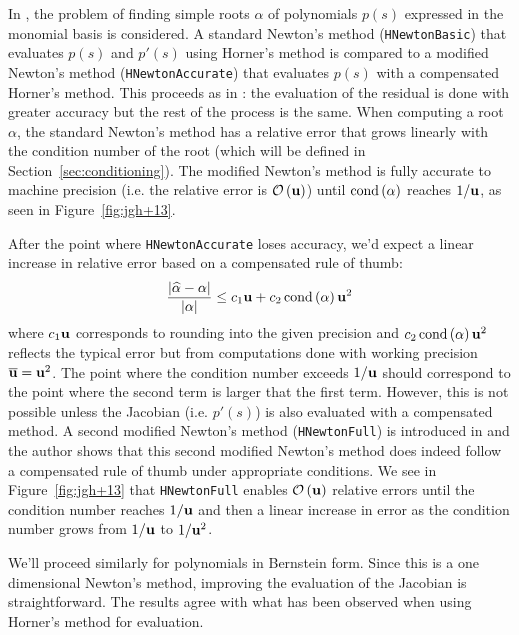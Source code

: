 In \cite{Graillat2008}, the problem of finding simple roots \(\alpha\) of
polynomials \(p(s)\) expressed in the monomial basis is considered.
A standard Newton's method (\texttt{HNewtonBasic}) that evaluates \(p(s)\)
and \(p'(s)\) using Horner's method is compared to a modified Newton's method
(\texttt{HNewtonAccurate}) that evaluates \(p(s)\) with a compensated
Horner's method. This proceeds as in \cite{Tisseur2001}: the evaluation of
the residual is done with greater accuracy but the rest of the process
is the same. When computing a root \(\alpha\), the standard Newton's method
has a relative error that grows linearly with the condition number of the
root (which will be defined in Section~\ref{sec:conditioning}). The
modified Newton's method is fully accurate to machine precision (i.e.
the relative error is \(\mathcal{O}\left(\mathbf{u}\right)\)) until \(\operatorname{cond}\left(\alpha\right)\) reaches
\(1/\mathbf{u}\), as seen in Figure~\ref{fig:jgh+13}.

After the point where \texttt{HNewtonAccurate} loses accuracy, we'd
expect a linear increase in relative error based on a compensated
rule of thumb:
\begin{equation}
\frac{\left|\widehat{\alpha} - \alpha\right|}{\left|\alpha\right|} \leq
  c_1 \mathbf{u} + c_2 \operatorname{cond}\left(\alpha\right) \mathbf{u}^2
\end{equation}
where \(c_1 \mathbf{u}\) corresponds to rounding into the given
precision and \(c_2 \operatorname{cond}\left(\alpha\right) \mathbf{u}^2\) reflects the
typical error but from computations done with working precision
\(\overline{\mathbf{u}} = \mathbf{u}^2\). The point
where the condition number exceeds \(1/\mathbf{u}\) should correspond to
the point where the second term is larger that the
first term. However, this is not possible unless the
Jacobian (i.e. \(p'(s)\)) is also evaluated with a compensated
method. A second modified Newton's method (\texttt{HNewtonFull}) is
introduced in \cite[Section~8]{Jiang2013} and the author shows that
this second modified Newton's method does indeed follow a compensated
rule of thumb under appropriate conditions. We see in
Figure~\ref{fig:jgh+13} that \texttt{HNewtonFull} enables
\(\mathcal{O}\left(\mathbf{u}\right)\) relative errors until the condition number reaches
\(1/\mathbf{u}\) and then a linear increase in error as the condition number
grows from \(1/\mathbf{u}\) to \(1/\mathbf{u}^2\).

We'll proceed similarly for polynomials in
Bernstein form. Since this is a one dimensional Newton's method, improving
the evaluation of the Jacobian is straightforward. The results agree with
what has been observed when using Horner's method for evaluation.

